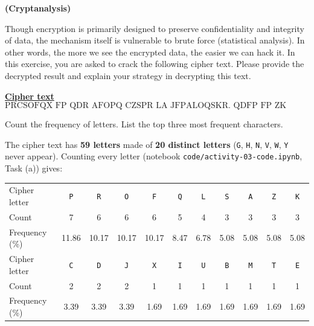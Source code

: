 \documentclass[a4paper, 10pt]{article}
\begin{document}
\begin{problem}
\textbf{(Cryptanalysis)}
\par Though encryption is primarily designed to preserve confidentiality and integrity of data,
the mechanism itself is vulnerable to brute force (statistical analysis).
In other words, the more we see the encrypted data, the easier we can hack it.
In this exercise, you are asked to crack the following cipher text.
Please provide the decrypted result and explain your strategy in decrypting this text.

\par\noindent\textbf{\underline{Cipher text}}
\[ \text{PRCSOFQX FP QDR AFOPQ CZSPR LA JFPALOQSKR. QDFP FP ZK LIUBROJZK MOLTROE.} \]

\begin{subproblems_alpha}
	\item Count the frequency of letters. List the top three most frequent characters.
	      \myspace[v][3][mm]
	      \begin{solution}
		      The cipher text has \textbf{59 letters} made of \textbf{20 distinct letters}
		      (\texttt{G}, \texttt{H}, \texttt{N}, \texttt{V}, \texttt{W}, \texttt{Y} never appear).
		      Counting every letter (notebook \texttt{code/activity-03-code.ipynb}, Task (a)) gives:
		      \begin{center}
			      \footnotesize
			      \setlength{\tabcolsep}{4pt}
			      \begin{tabular}{l*{10}{c}}
				      \toprule
				      Cipher letter  & \texttt{P} & \texttt{R} & \texttt{O} & \texttt{F} & \texttt{Q} & \texttt{L} & \texttt{S} & \texttt{A} & \texttt{Z} & \texttt{K} \\
				      Count          & 7          & 6          & 6          & 6          & 5          & 4          & 3          & 3          & 3          & 3          \\
				      Frequency (\%) & 11.86      & 10.17      & 10.17      & 10.17      & 8.47       & 6.78       & 5.08       & 5.08       & 5.08       & 5.08       \\
				      \midrule
				      Cipher letter  & \texttt{C} & \texttt{D} & \texttt{J} & \texttt{X} & \texttt{I} & \texttt{U} & \texttt{B} & \texttt{M} & \texttt{T} & \texttt{E} \\
				      Count          & 2          & 2          & 2          & 1          & 1          & 1          & 1          & 1          & 1          & 1          \\
				      Frequency (\%) & 3.39       & 3.39       & 3.39       & 1.69       & 1.69       & 1.69       & 1.69       & 1.69       & 1.69       & 1.69       \\
				      \bottomrule
			      \end{tabular}
		      \end{center}


\end{solution}
\end{subproblems_alpha}
\end{problem}
\end{document}
